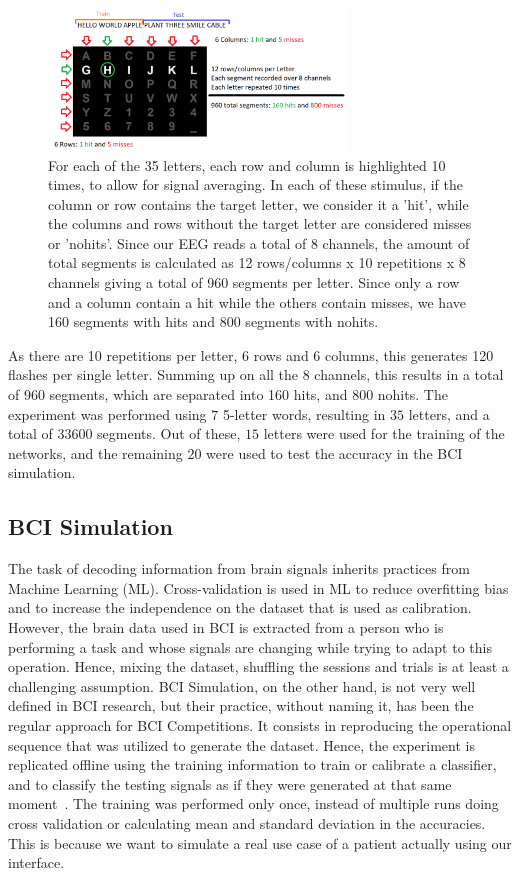 \documentclass[conference]{IEEEtran}
\begin{document}
\begin{figure}[htbp]
\centerline{\includegraphics[width=8cm, keepaspectratio]{images/experiment.png}}
\caption[Experimental protocol visualization]{For each of the 35 letters, each row and column is highlighted 10 times, to allow for signal averaging. In each of these stimulus, if the column or row contains the target letter, we consider it a 'hit', while the columns and rows without the target letter are considered misses or 'nohits'. Since our EEG reads a total of 8 channels, the amount of total segments is calculated as 12 rows/columns x 10 repetitions x 8 channels  giving a total of 960 segments per letter. Since only a row and a column contain a hit while the others contain misses, we have 160 segments with hits and 800 segments with nohits.}
\label{fig:datastructure}
\end{figure}

As there are 10 repetitions per letter, 6 rows and 6 columns, this generates 120 flashes per single letter.  Summing up on all the $8$ channels, this results in a total of 960 segments, which are separated into 160 hits, and 800 nohits.  The experiment was performed using $7$ 5-letter words, resulting in $35$ letters, and a total of $33600$ segments. Out of these, $15$ letters were used for the training of the networks, and the remaining $20$ were used to test the accuracy in the BCI simulation.


\subsection{BCI Simulation}

The task of decoding information from brain signals inherits practices from Machine Learning (ML). Cross-validation is used in ML to reduce overfitting bias and to increase the independence on the dataset that is used as calibration. However, the brain data used in BCI is extracted from a person who is performing a task and whose signals are changing while trying to adapt to this operation. Hence, mixing the dataset, shuffling the sessions and trials is at least a challenging assumption. BCI Simulation, on the other hand, is not very well defined in BCI research, but their practice, without naming it, has been the regular approach for BCI Competitions. It consists in reproducing the operational sequence that was utilized to generate the dataset. Hence, the experiment is replicated offline using the training information to train or calibrate a classifier, and to classify the testing signals as if they were generated at that same moment~\cite{ramele.2018}. The training was performed only once, instead of multiple runs doing cross validation or calculating mean and standard deviation in the accuracies. This is because we want to simulate a real use case of a patient actually using our interface.
\end{document}
